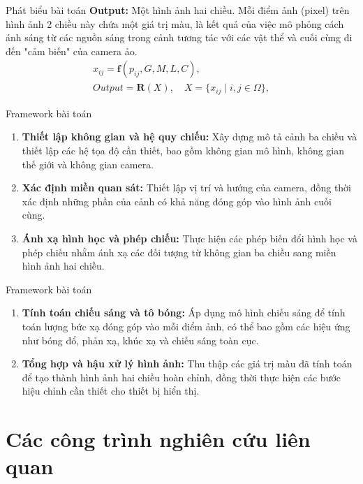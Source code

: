 \documentclass[11pt, aspectratio=169]{beamer}
\begin{document}
\begin{frame}{Phát biểu bài toán}
	\textbf{Output:} Một hình ảnh hai chiều. Mỗi điểm ảnh (pixel) trên hình ảnh 2 chiều này chứa một giá trị màu, là kết quả của việc mô phỏng cách ánh sáng từ các nguồn sáng trong cảnh tương tác với các vật thể và cuối cùng đi đến "cảm biến" của camera ảo.\\
	\begin{gather*}
		x_{ij} = \textbf{f}(p_{ij}, G, M, L, C), \\
		Output = \textbf{R}(X), \quad X = \{ x_{ij} \mid i, j \in \Omega \},
	\end{gather*}
\end{frame}

\begin{frame}{Framework bài toán}
	\begin{enumerate}
		\item \textbf{Thiết lập không gian và hệ quy chiếu:} Xây dựng mô tả cảnh ba chiều và thiết lập các hệ tọa độ cần thiết, bao gồm không gian mô hình, không gian thế giới và không gian camera.
		
		\item \textbf{Xác định miền quan sát:} Thiết lập vị trí và hướng của camera, đồng thời xác định những phần của cảnh có khả năng đóng góp vào hình ảnh cuối cùng.
		
		\item \textbf{Ánh xạ hình học và phép chiếu:} Thực hiện các phép biến đổi hình học và phép chiếu nhằm ánh xạ các đối tượng từ không gian ba chiều sang miền hình ảnh hai chiều.
	\end{enumerate}
\end{frame}

\begin{frame}{Framework bài toán}
	\begin{enumerate}
		\item \textbf{Tính toán chiếu sáng và tô bóng:} Áp dụng mô hình chiếu sáng để tính toán lượng bức xạ đóng góp vào mỗi điểm ảnh, có thể bao gồm các hiệu ứng như bóng đổ, phản xạ, khúc xạ và chiếu sáng toàn cục.
		
		\item \textbf{Tổng hợp và hậu xử lý hình ảnh:} Thu thập các giá trị màu đã tính toán để tạo thành hình ảnh hai chiều hoàn chỉnh, đồng thời thực hiện các bước hiệu chỉnh cần thiết cho thiết bị hiển thị.
	\end{enumerate}
\end{frame}

\section{Các công trình nghiên cứu liên quan}
\end{document}
